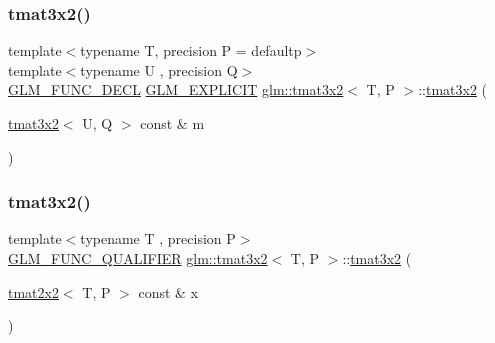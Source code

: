 \mbox{\label{structglm_1_1tmat3x2_aca2535c7f0a60d41ce48c7cd0a7f83b9}} 
\subsubsection{\texorpdfstring{tmat3x2()}{tmat3x2()}\hspace{0.1cm}{\footnotesize\ttfamily [10/22]}}
{\footnotesize\ttfamily template$<$typename T, precision P = defaultp$>$ \\
template$<$typename U , precision Q$>$ \\
\mbox{\hyperlink{setup_8hpp_ab2d052de21a70539923e9bcbf6e83a51}{G\+L\+M\+\_\+\+F\+U\+N\+C\+\_\+\+D\+E\+CL}} \mbox{\hyperlink{setup_8hpp_a6c74f5a5e7b134ab69023ff9a30d4d5d}{G\+L\+M\+\_\+\+E\+X\+P\+L\+I\+C\+IT}} \mbox{\hyperlink{structglm_1_1tmat3x2}{glm\+::tmat3x2}}$<$ T, P $>$\+::\mbox{\hyperlink{structglm_1_1tmat3x2}{tmat3x2}} (\begin{DoxyParamCaption}\item[{\mbox{\hyperlink{structglm_1_1tmat3x2}{tmat3x2}}$<$ U, Q $>$ const \&}]{m }\end{DoxyParamCaption})}

\mbox{\label{structglm_1_1tmat3x2_a9af622af900c3ddb1a075d5083d700bd}} 
\subsubsection{\texorpdfstring{tmat3x2()}{tmat3x2()}\hspace{0.1cm}{\footnotesize\ttfamily [11/22]}}
{\footnotesize\ttfamily template$<$typename T , precision P$>$ \\
\mbox{\hyperlink{setup_8hpp_a33fdea6f91c5f834105f7415e2a64407}{G\+L\+M\+\_\+\+F\+U\+N\+C\+\_\+\+Q\+U\+A\+L\+I\+F\+I\+ER}} \mbox{\hyperlink{structglm_1_1tmat3x2}{glm\+::tmat3x2}}$<$ T, P $>$\+::\mbox{\hyperlink{structglm_1_1tmat3x2}{tmat3x2}} (\begin{DoxyParamCaption}\item[{\mbox{\hyperlink{structglm_1_1tmat2x2}{tmat2x2}}$<$ T, P $>$ const \&}]{x }\end{DoxyParamCaption})}



